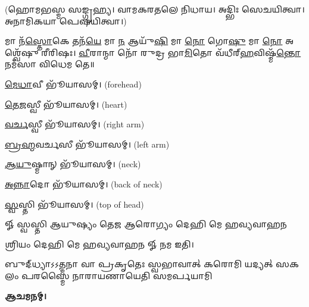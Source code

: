 (𑌹𑍋𑌮𑌭𑌸𑍍𑌮 𑌸𑌙𑍍𑌗𑍃𑌹𑍍𑌯। 𑌵𑌾𑌮𑌕𑌰𑌤𑌲𑍇 𑌨𑌿𑌧𑌾𑌯। 𑌅𑌦𑍍𑌭𑌿𑌃 𑌸𑍇𑌚𑌯𑌿𑌤𑍍𑌵𑌾। 𑌅𑌨𑌾𑌮𑌿𑌕𑌯𑌾 𑌪𑍇𑌷𑌯𑌿𑌤𑍍𑌵𑌾।)

 𑌮𑌾 𑌨᳴\-\ul{𑌸𑍍𑌤𑍋}\-𑌕𑍇 𑌤𑌨᳴\-\ul{𑌯𑍇} 𑌮𑌾 \ul{𑌨} 𑌆𑌯𑍁᳴\-\ul{𑌷𑌿} 𑌮𑌾 \ul{𑌨𑍋} 𑌗𑍋\-\ul{𑌷𑍁} 𑌮𑌾 \ul{𑌨𑍋} 𑌅𑌶𑍍𑌵𑍇᳴𑌷𑍁 𑌰𑍀𑌰𑌿𑌷𑌃। \ul{𑌵𑍀}\-𑌰𑌾𑌨𑍍𑌮𑌾 𑌨𑍋᳴ 𑌰𑍁𑌦𑍍𑌰 𑌭𑌾\-\ul{𑌮𑌿}\-𑌤𑍋 𑌵᳴𑌧𑍀𑌰𑍍‌\-\ul{𑌹}\-𑌵𑌿𑌷𑍍𑌮᳴\-\ul{𑌨𑍍𑌤𑍋} 𑌨𑌮᳴𑌸𑌾 𑌵𑌿𑌧𑍇𑌮 𑌤𑍇॥
 
 \ul{𑌮𑍇}\-\-\ul{𑌧𑌾}\-𑌵𑍀 𑌭𑍂᳴𑌯𑌾𑌸𑌮𑍍। (forehead)
 
 \ul{𑌤𑍇}\-\-\ul{𑌜}\-𑌸𑍍𑌵𑍀 𑌭𑍂᳴𑌯𑌾𑌸𑌮𑍍। (heart)
 
 \ul{𑌵}\-\-\ul{𑌰𑍍𑌚}\-𑌸𑍍𑌵𑍀 𑌭𑍂᳴𑌯𑌾𑌸𑌮𑍍। (right arm)
 
 \ul{𑌬𑍍𑌰}\-\-\ul{𑌹𑍍𑌮}\-𑌵𑌰𑍍𑌚𑌸𑍀 𑌭𑍂᳴𑌯𑌾𑌸𑌮𑍍। (left arm)
 
 \ul{𑌆}\-\-\ul{𑌯𑍁}\-𑌷𑍍𑌮𑌾𑌨𑍍 𑌭𑍂᳴𑌯𑌾𑌸𑌮𑍍। (neck)
 
 \ul{𑌅}\-\-\ul{𑌨𑍍𑌨𑌾}\-𑌦𑍋 𑌭𑍂᳴𑌯𑌾𑌸𑌮𑍍। (back of neck)
 
 \ul{𑌸𑍍𑌵}\-𑌸𑍍𑌤𑌿 𑌭𑍂᳴𑌯𑌾𑌸𑌮𑍍। (top of head)
 
𑍐 𑌸𑍍𑌵𑌸𑍍𑌤𑌿 
{𑌆𑌯𑍁𑌷𑍍𑌯𑌂 𑌤𑍇𑌜 𑌆𑌰𑍋𑌗𑍍𑌯𑌂 𑌦𑍇𑌹𑌿 𑌮𑍇 𑌹𑌵𑍍𑌯𑌵𑌾𑌹𑌨}
 
𑌶𑍍𑌰𑌿𑌯𑌂 𑌦𑍇𑌹𑌿 𑌮𑍇 𑌹𑌵𑍍𑌯𑌵𑌾𑌹𑌨 𑍐 𑌨𑌮 𑌇𑌤𑌿।

{𑌬𑍁𑌦𑍍‌𑌧𑍍𑌯𑌾𑌽𑌽𑌤𑍍𑌮𑌨𑌾 𑌵𑌾 𑌪𑍍𑌰𑌕𑍃𑌤𑍇𑌃 𑌸𑍍𑌵𑌭𑌾𑌵𑌾𑌤𑍍}
{𑌕𑌰𑍋𑌮𑌿 𑌯𑌦𑍍𑌯𑌤𑍍 𑌸𑌕𑌲𑌂 𑌪𑌰𑌸𑍍𑌮𑍈}
{𑌨𑌾𑌰𑌾𑌯𑌣𑌾𑌯𑍇𑌤𑌿 𑌸𑌮𑌰𑍍𑌪𑌯𑌾𑌮𑌿}

\textbf{𑌆𑌚𑌮𑌨𑌮𑍍।}


 

